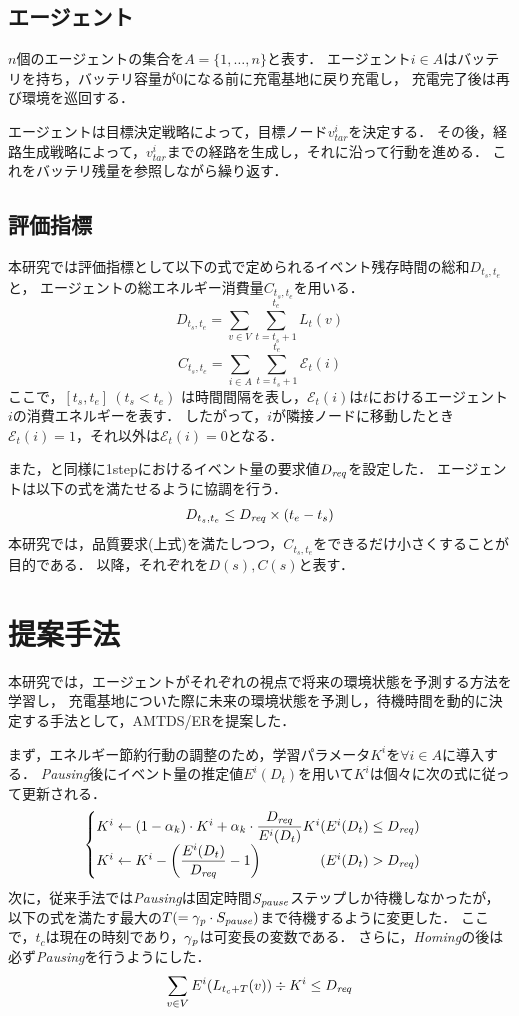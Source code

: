 \documentclass[11pt,a4j,twocolumn]{jarticle}
\def\AgentSet{A}
\def\Dreq{{D_{\it req}}}
\def\En{\mathcal{E}}
\def\PausingInt{{S_{\it pause}}}
\def\PauseTimeFactor{{\gamma_{\it p}}}
\begin{document}
\subsection{エージェント}
$n$個のエージェントの集合を$\AgentSet=\{1,\dots ,n\}$と表す．
エージェント$i\in\AgentSet$はバッテリを持ち，バッテリ容量が0になる前に充電基地に戻り充電し，
充電完了後は再び環境を巡回する．
\par

エージェントは目標決定戦略によって，目標ノード$v^i_{tar}$を決定する．
その後，経路生成戦略によって，$v^i_{tar}$までの経路を生成し，それに沿って行動を進める．
これをバッテリ残量を参照しながら繰り返す．

\subsection{評価指標}
本研究では評価指標として以下の式で定められるイベント残存時間の総和$D_{t_s,t_e}$と，
エージェントの総エネルギー消費量$C_{t_s,t_e}$を用いる．
%
\[
  D_{t_s,t_e} = \sum_{v \in V} \sum^{t_e}_{t=t_s+1} L_t(v)
\]
%
\[
  C_{t_s,t_e} = \sum_{i \in \AgentSet} \sum^{t_e}_{t=t_s+1} \En_t(i)
\]
%
ここで，$[t_s,t_e]~(t_s < t_e)$ は時間間隔を表し，$\En_t(i)$は$t$におけるエージェント$i$の消費エネルギーを表す．
したがって，$i$が隣接ノードに移動したとき$\En_t(i)=1$，それ以外は$\En_t(i)=0$となる．
\par
また，\cite{Wu2019}と同様に1stepにおけるイベント量の要求値$\Dreq$を設定した．
エージェントは以下の式を満たせるように協調を行う．
%
\[
  D_{t_s,t_e}\leq \Dreq \times (t_e - t_s)
\]
%
本研究では，品質要求(上式)を満たしつつ，$C_{t_s, t_e}$をできるだけ小さくすることが目的である．
以降，それぞれを$D(s), C(s)$と表す．


\section{提案手法}
本研究では，エージェントがそれぞれの視点で将来の環境状態を予測する方法を学習し，
充電基地についた際に未来の環境状態を予測し，待機時間を動的に決定する手法として，AMTDS/ERを提案した．
\par

まず，エネルギー節約行動の調整のため，学習パラメータ$K^i$を$\forall i\in \AgentSet$に導入する．
{\em Pausing}後にイベント量の推定値$E^i(D_t)$を用いて$K^i$は個々に次の式に従って更新される．
%
\[
  \begin{cases}
    K^i \gets (1 - \alpha_k) \cdot K^i + \alpha_k \cdot \dfrac{\Dreq}{E^i(D_t)}K^i 
    \hfill (E^i(D_t) \leq \Dreq)\\
    K^i \gets K^i - \left( \dfrac{E^i(D_t)}{\Dreq} - 1 \right) 
    \hfill (E^i(D_t) > \Dreq)
  \end{cases}
\]
%
次に，従来手法では{\em Pausing}は固定時間$\PausingInt$ステップしか待機しなかったが，
以下の式を満たす最大の$T (= \PauseTimeFactor\cdot\PausingInt)$まで待機するように変更した．
ここで，$t_c$は現在の時刻であり，$\PauseTimeFactor$は可変長の変数である．
さらに，{\em Homing}の後は必ず{\em Pausing}を行うようにした．
% 
\[
 \sum_{v \in V} E^i(L_{t_c+T}(v)) \div K^i \leq \Dreq
\] 
%
\end{document}

